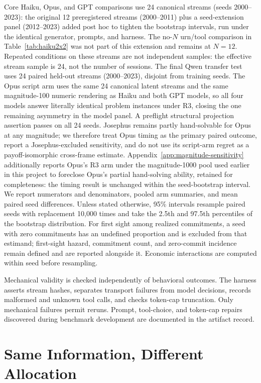 \documentclass{article}
\begin{document}
Core Haiku, Opus, and GPT comparisons use 24 canonical streams (seeds
2000--2023): the original 12 preregistered streams (2000--2011) plus a
seed-extension panel (2012--2023) added post hoc to tighten the bootstrap
intervals, run under the identical generator, prompts, and harness. The
no-$N$ urn/tool comparison in Table~\ref{tab:haiku2x2} was not part of this
extension and remains at $N=12$.
Repeated conditions on these streams are not independent samples: the effective
stream sample is 24, not the number of sessions. The final Qwen transfer test
uses 24 paired held-out streams (2000--2023), disjoint from training seeds.
The Opus script arm uses the same 24 canonical latent streams and the same
magnitude-100 numeric rendering as Haiku and both GPT models, so all four
models answer literally identical problem instances under R3, closing the one
remaining asymmetry in the model panel. A preflight structural projection
assertion passes on all 24 seeds. Josephus remains partly hand-solvable for
Opus at any magnitude; we therefore treat Opus timing as the primary paired
outcome, report a Josephus-excluded sensitivity, and do not use its script-arm
regret as a payoff-isomorphic cross-frame estimate.
Appendix~\ref{app:magnitude-sensitivity} additionally reports Opus's R3 arm
under the magnitude-1000 pool used earlier in this project to foreclose
Opus's partial hand-solving ability, retained for completeness: the timing
result is unchanged within the seed-bootstrap interval.
We report numerators and denominators, pooled arm summaries, and mean paired
seed differences. Unless stated otherwise, 95\% intervals resample paired
seeds with replacement 10,000 times and take the 2.5th and 97.5th percentiles
of the bootstrap distribution. For first sight among realized commitments, a
seed with zero commitments has an undefined proportion and is excluded from
that estimand; first-sight hazard, commitment count, and zero-commit incidence
remain defined and are reported alongside it. Economic interactions are
computed within seed before resampling.

Mechanical validity is checked independently of behavioral outcomes. The
harness asserts stream hashes, separates transport failures from model
decisions, records malformed and unknown tool calls, and checks token-cap
truncation. Only mechanical failures permit reruns. Prompt, tool-choice, and
token-cap repairs discovered during benchmark development are documented in
the artifact record.

\section{Same Information, Different Allocation}
\end{document}
